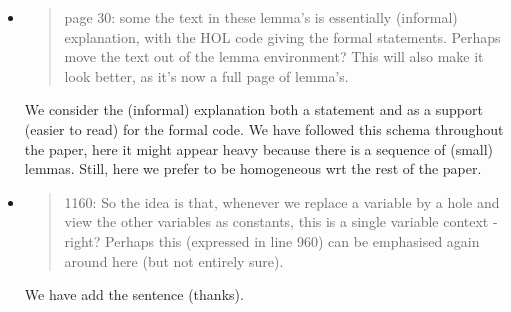 \begin{itemize}

  \item \begin{quote}
page 30: some the text in these lemma's is essentially (informal) explanation, with the HOL code giving the formal statements. Perhaps move the text out of the lemma environment? This will also make it look better, as it's now a full page of lemma's. 
\end{quote}
  \Mark We consider the (informal) explanation both  a statement 
and  as a support (easier to read) for the formal code. 
We have followed this schema throughout the paper, here it might appear 
heavy because there is a sequence of (small) lemmas. 
Still, here we prefer to be homogeneous wrt the rest of the paper. 


  \item \begin{quote}
1160: So the idea is that, whenever we replace a variable by a hole and view the other variables as constants, this is a single variable context - right? Perhaps this (expressed in line 960) can be emphasised again around here (but not entirely sure). 
\end{quote}
  \Mark We have add the sentence (thanks).






\end{itemize}
